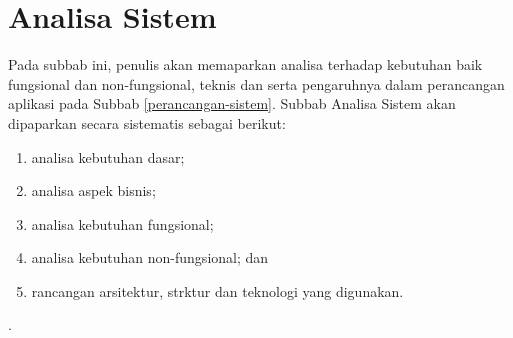 \section{Analisa Sistem}
	Pada subbab ini, penulis akan memaparkan analisa terhadap kebutuhan baik fungsional dan non-fungsional, teknis dan serta pengaruhnya dalam perancangan aplikasi pada Subbab \ref{perancangan-sistem}. Subbab Analisa Sistem akan dipaparkan secara sistematis sebagai berikut:
	\begin{enumerate}[label=\alph*.]
		\item analisa kebutuhan dasar;
		\item analisa aspek bisnis;
		\item analisa kebutuhan fungsional;
		\item analisa kebutuhan non-fungsional; dan
		\item rancangan arsitektur, strktur dan teknologi yang digunakan.
	\end{enumerate}.
	
	
	
	
	
	
	
	
	
